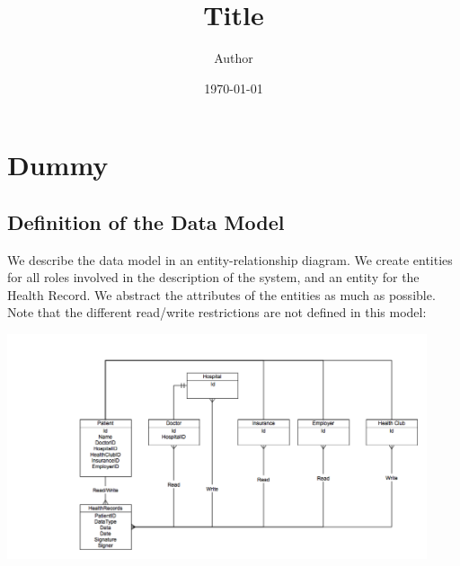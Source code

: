 \documentclass[]{article}
\begin{document}
\title{Title}
\author{Author}
\date{\today}
\maketitle
\section{Dummy}

\subsection{Definition of the Data Model}
We describe the data model in an entity-relationship diagram. We create entities for all roles involved in the description of the system, and an entity for the Health Record. We abstract the attributes of the entities as much as possible. Note that the different read/write restrictions are not defined in this model:

\includegraphics[width=350pt]{datamodel.png}
\end{document}
